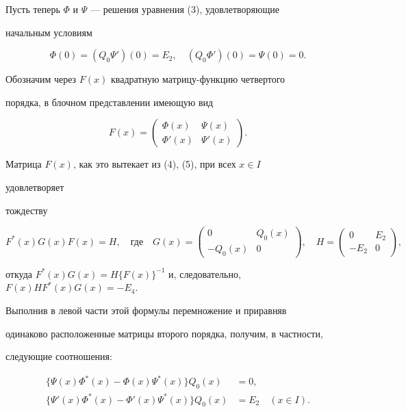  


Пусть теперь $\Phi$ и $\Psi$ --- решения уравнения (3), удовлетворяющие 


начальным условиям 


\begin{equation} 


\Phi(0)=(Q_0\Psi')(0)=E_2,\quad 


(Q_0\Phi')(0)=\Psi(0)=0. 


\end{equation} 


Обозначим через $F(x)$ квадратную матрицу-функцию четвертого 


порядка, в блочном представлении имеющую вид 


$$ 


F(x)= 


\begin{pmatrix} 


\Phi(x) & \Psi(x) \\ \Phi'(x) & \Psi'(x) 


\end{pmatrix} 


. 


$$ 


Матрица $F(x)$, как это вытекает из (4), (5), при всех $x\in I$ 


удовлетворяет 


тождеству 


$$


F^*(x)G(x)F(x)=H,\quad


\text{где}


\quad G(x)=\begin{pmatrix}0 & Q_0(x) \\ -Q_0(x) & 0 \end{pmatrix}, \quad


H=\begin{pmatrix} 0 & E_2 \\ -E_2 & 0\end{pmatrix}, 


$$


откуда $F^*(x)G(x)=H\{F(x)\}^{-1}$ и, следовательно, $F(x)H 


F^*(x)G(x)=-E_4$. 


Выполнив в левой части этой формулы перемножение и приравняв 


одинаково расположенные матрицы второго порядка, получим, в частности, 


следующие соотношения: 


\begin{equation} 


\begin{split} 


\{\Psi(x)\Phi^*(x)-\Phi(x)\Psi^*(x)\}Q_0(x)&=0,\\ 


\{\Psi'(x)\Phi^*(x)-\Phi'(x)\Psi^*(x)\}Q_0(x)&=E_2 


\quad (x\in I). 


\end{split} 


\end{equation} 


